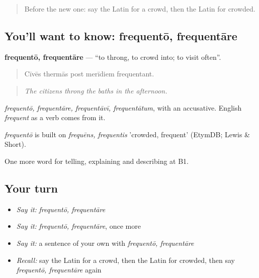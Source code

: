 \label{lesson:LA-C460-frequento}



\begin{quote}
Before the new one: say the Latin for a crowd, then the Latin for crowded.
\end{quote}

\subsection*{You'll want to know: frequentō, frequentāre}
\textbf{frequentō, frequentāre} — \textquotedblleft{}to throng, to crowd into; to visit often\textquotedblright{}.

\begin{quote}
Cīvēs thermās post merīdiem frequentant.
\end{quote}

\begin{quote}
\emph{The citizens throng the baths in the afternoon.}
\end{quote}

\emph{frequentō, frequentāre, frequentāvī, frequentātum}, with an accusative. English \emph{frequent} as a verb comes from it.

\begin{cousinweb}
\emph{frequentō} is built on \emph{frequēns, frequentis} 'crowded, frequent' (EtymDB; Lewis \& Short).
\end{cousinweb}

\begin{grammarlens}[title={What you've built}]
One more word for telling, explaining and describing at B1.
\end{grammarlens}

\subsection*{Your turn}
\begin{itemize}
\raggedright
  \item \emph{Say it:} \emph{frequentō, frequentāre}
  \item \emph{Say it:} \emph{frequentō, frequentāre}, once more
  \item \emph{Say it:} a sentence of your own with \emph{frequentō, frequentāre}
  \item \emph{Recall:} say the Latin for a crowd, then the Latin for crowded, then say \emph{frequentō, frequentāre} again
\end{itemize}

